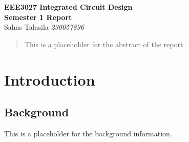 \documentclass[a4paper,12pt]{article}
\begin{document}
\begin{titlepage}
    \centering
    \vspace*{2cm}
    \Huge{\textbf{EEE3027 Integrated Circuit Design}}\\[0.5cm]
    \Large{\textbf{Semester 1 Report}}\\ 
    \Large{Sahas Talasila \textit{230057896}}
    \vfill
\end{titlepage}

\tableofcontents
\newpage

\begin{abstract}
    This is a placeholder for the abstract of the report.
\end{abstract}

\section{Introduction}

\subsection{Background}
This is a placeholder for the background information.
\end{document}
